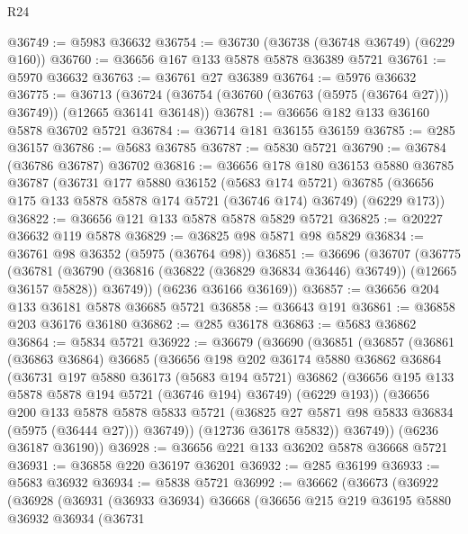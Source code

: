 \begin{lexlean}{R24}
\begin{coremodule}
@36749 := @5983 @36632
@36754 := @36730 (@36738 (@36748 @36749) (@6229 @160))
@36760 := @36656 @167 @133 @5878 @5878 @36389 @5721
@36761 := @5970 @36632
@36763 := @36761 @27 @36389
@36764 := @5976 @36632
@36775 := @36713
    (@36724 (@36754 (@36760 (@36763 (@5975 (@36764 @27))) @36749)) (@12665 @36141 @36148))
@36781 := @36656 @182 @133 @36160 @5878 @36702 @5721
@36784 := @36714 @181 @36155 @36159
@36785 := @285 @36157
@36786 := @5683 @36785
@36787 := @5830 @5721
@36790 := @36784 (@36786 @36787) @36702
@36816 := @36656
    @178
    @180
    @36153
    @5880
    @36785
    @36787
    (@36731
      @177
      @5880
      @36152
      (@5683 @174 @5721)
      @36785
      (@36656 @175 @133 @5878 @5878 @174 @5721 (@36746 @174) @36749)
      (@6229 @173))
@36822 := @36656 @121 @133 @5878 @5878 @5829 @5721
@36825 := @20227 @36632 @119 @5878
@36829 := @36825 @98 @5871 @98 @5829
@36834 := @36761 @98 @36352 (@5975 (@36764 @98))
@36851 := @36696
    (@36707
      (@36775
        (@36781
          (@36790 (@36816 (@36822 (@36829 @36834 @36446) @36749)) (@12665 @36157 @5828))
          @36749))
      (@6236 @36166 @36169))
@36857 := @36656 @204 @133 @36181 @5878 @36685 @5721
@36858 := @36643 @191
@36861 := @36858 @203 @36176 @36180
@36862 := @285 @36178
@36863 := @5683 @36862
@36864 := @5834 @5721
@36922 := @36679
    (@36690
      (@36851
        (@36857
          (@36861
            (@36863 @36864)
            @36685
            (@36656
              @198
              @202
              @36174
              @5880
              @36862
              @36864
              (@36731
                @197
                @5880
                @36173
                (@5683 @194 @5721)
                @36862
                (@36656 @195 @133 @5878 @5878 @194 @5721 (@36746 @194) @36749)
                (@6229 @193))
              (@36656
                @200
                @133
                @5878
                @5878
                @5833
                @5721
                (@36825 @27 @5871 @98 @5833 @36834 (@5975 (@36444 @27)))
                @36749))
            (@12736 @36178 @5832))
          @36749))
      (@6236 @36187 @36190))
@36928 := @36656 @221 @133 @36202 @5878 @36668 @5721
@36931 := @36858 @220 @36197 @36201
@36932 := @285 @36199
@36933 := @5683 @36932
@36934 := @5838 @5721
@36992 := @36662
    (@36673
      (@36922
        (@36928
          (@36931
            (@36933 @36934)
            @36668
            (@36656
              @215
              @219
              @36195
              @5880
              @36932
              @36934
              (@36731

\end{coremodule}
\end{lexlean}

